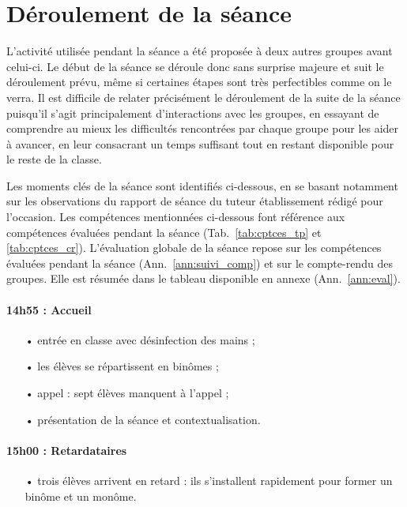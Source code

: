 \documentclass[12pt,a4paper, fleqn]{report}
\begin{document}
\section{Déroulement de la séance}
\label{sec:deroullement}

L'activité utilisée pendant la séance a été proposée à deux autres groupes avant celui-ci.
Le début de la séance se déroule donc sans surprise majeure et suit le déroulement prévu, même si certaines étapes sont très perfectibles comme on le verra.
Il est difficile de relater précisément le déroulement de la suite de la séance puisqu'il s'agit principalement  d'interactions avec les groupes, en essayant de comprendre au mieux les difficultés rencontrées par chaque groupe pour les aider à avancer, en leur consacrant un temps suffisant tout en restant disponible pour le reste de la classe.

Les moments clés de la séance sont identifiés ci-dessous, en se basant notamment sur les observations du rapport de séance du tuteur établissement rédigé pour l'occasion.
Les compétences mentionnées ci-dessous font référence aux compétences évaluées pendant la séance (Tab.~\ref{tab:cptces_tp} et \ref{tab:cptces_cr}).
L'évaluation globale de la séance repose sur les compétences évaluées pendant la séance (Ann.~\ref{ann:suivi_comp}) et sur le compte-rendu des groupes.
Elle est résumée dans le tableau disponible en annexe (Ann.~\ref{ann:eval}).

\paragraph{14h55 : Accueil}
\begin{itemize}
\item[•] entrée en classe avec désinfection des mains ;
\item[•] les élèves se répartissent en binômes ;
\item[•] appel : sept élèves manquent à l'appel ;
\item[•] présentation de la séance et contextualisation.
\end{itemize}

\paragraph{15h00 : Retardataires}
\begin{itemize}
\item[•] trois élèves arrivent en retard : ils s'installent rapidement pour former un binôme et un monôme.
\end{itemize}
\end{document}
